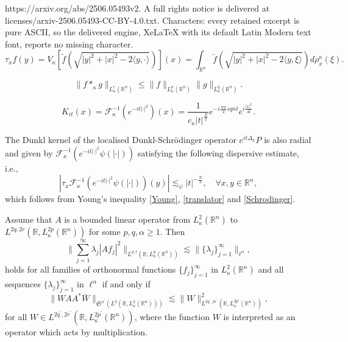 \documentclass[10pt,a4paper]{amsart}
\begin{document}
https://arxiv.org/abs/2506.05493v2. A full rights notice is delivered at licenses/arxiv-2506.05493-CC-BY-4.0.txt. Characters: every retained excerpt is pure ASCII, so the delivered engine, XeLaTeX with its default Latin Modern text font, reports no missing character.
\begin{equation} \label{translator}
\tau_xf(y)=V_\kappa[\tilde{f}\left(\sqrt{|y|^2+|x|^2-2\langle y,\cdot\rangle}\right)](x)=\int_{\mathbb{R}^n}\tilde{f}\left(\sqrt{|y|^2+|x|^2-2\langle y,\xi\rangle}\right)d\rho^\kappa_x(\xi).
\end{equation}

\begin{equation}\label{Young}
\|f*_\kappa g\|_{L_\kappa^r(\mathbb{R}^n)}\leq \|f\|_{L_\kappa^p(\mathbb{R}^n)} \|g\|_{L_\kappa^q(\mathbb{R}^n)}.
\end{equation}

\begin{equation}\label{Schrodinger}
K_{it}(x)=\mathcal{F}^{-1}_\kappa\left(e^{-it|\cdot|^2}\right)(x)=\frac{1}{c_\kappa |t|^\frac{N}{2}}e^{-i\frac{N\pi}{4} sgn t}e^{i\frac{|x|^2}{4t}}.
\end{equation}

\begin{remark}
The Dunkl kernel of the localised  Dunkl-Schr\"{o}dinger operator $e^{it\Delta_\kappa}P$ is also radial and given by $\mathcal{F}^{-1}_\kappa (e^{-it|\cdot|^2} \psi(|\cdot|))$ satisfying the following dispersive estimate, i.e.,
\begin{equation}\label{cut-off decay}
   \left|\tau_x\mathcal{F}^{-1}_\kappa \left(e^{-it|\cdot|^2} \psi(|\cdot|)\right)(y)\right|\lesssim_\psi |t|^{-\frac{N}{2}}, \quad \forall x,y\in\mathbb{R}^n,
\end{equation}
which follows from Young's inequality \eqref{Young}, \eqref{translator} and \eqref{Schrodinger}.
\end{remark}

 \begin{lemma}\label{duality-principle} Assume that $A$ is a bounded linear operator from $L_\kappa^2(\mathbb{R}^n)$ to $L^{2q,2r}(\mathbb{R}, L_\kappa^{2p}(\mathbb{R}^n))$ for some $p,q,\alpha\geq 1$. Then 
         \begin{equation*}
			\bigg\|\sum_{j=1}^\infty \lambda_j|A f_j|^2\bigg\|_{L^{q,r}(\mathbb{R}, L_\kappa^{p}(\mathbb{R}^n))}\lesssim \|\{\lambda_j\}^\infty_{j=1}\|_{\ell^{\alpha}} ,
		\end{equation*}	
  holds for all families of orthonormal functions $\{f_j\}_{j=1}^\infty$ in $L_\kappa^2(\mathbb{R}^n)$ and all sequences $\{\lambda_j\}^\infty_{j=1}$ in $\ell^{\alpha}$ if and only if
		\begin{equation*}
	\big\|WAA^*\overline{W}\big\|_{\mathfrak{S}^{\alpha^\prime}(L^2(\mathbb{R}, L_\kappa^2(\mathbb{R}^n)))}\lesssim \big\|W\big\|^2_{L^{2q^\prime,2r^\prime}(\mathbb{R}, L_\kappa^{2p^\prime}(\mathbb{R}^n))},
		\end{equation*}
  for all $W\in L^{2q^\prime,2r^\prime}(\mathbb{R}, L_\kappa^{2p^\prime}(\mathbb{R}^n))$, where the function $W$ is interpreted as an operator which acts by multiplication.
	\end{lemma}
\end{document}
